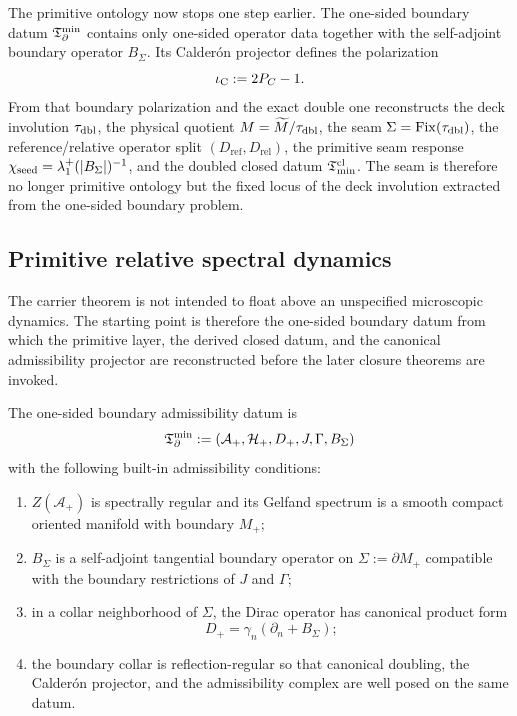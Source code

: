 \begin{remark}
The primitive ontology now stops one step earlier. The one-sided boundary datum $\mathfrak T_{\partial}^{\min}$
contains only one-sided operator data together with the self-adjoint boundary operator
$B_\Sigma$. Its Calder\'on projector defines the polarization
\[
\iota_{\mathrm C}:=2P_C-1.
\]
From that boundary polarization and the exact double one reconstructs the deck involution
$\tau_{\mathrm{dbl}}$, the physical quotient $M=\widetilde M/\tau_{\mathrm{dbl}}$, the seam
$\Sigma=\mathrm{Fix}(\tau_{\mathrm{dbl}})$, the reference/relative operator split
$(D_{\mathrm{ref}},D_{\mathrm{rel}})$, the primitive seam response
$\chi_{\mathrm{seed}}=\lambda_1^+(|B_\Sigma|)^{-1}$, and the doubled closed datum
$\mathfrak T_{\mathrm{min}}^{\mathrm{cl}}$. The seam is therefore no longer primitive ontology but the fixed locus of
the deck involution extracted from the one-sided boundary problem.
\end{remark}

\subsection{Primitive relative spectral dynamics}

The carrier theorem is not intended to float above an unspecified microscopic dynamics. The
starting point is therefore the one-sided boundary datum from which the primitive layer, the
derived closed datum, and the canonical admissibility projector are reconstructed before the later
closure theorems are invoked.

\begin{definition}
\label{def:reduced-theorem-datum}
The one-sided boundary admissibility datum is
\[
\mathfrak T_{\partial}^{\min}:=(\mathcal A_+,\mathcal H_+,D_+,J,\Gamma,B_\Sigma)
\]
with the following built-in admissibility conditions:
\begin{enumerate}[label=(\roman*), leftmargin=1.5em, topsep=3pt, itemsep=2pt]
    \item $Z(\mathcal A_+)$ is spectrally regular and its Gelfand spectrum is a smooth compact oriented manifold with boundary $M_+$;
    \item $B_\Sigma$ is a self-adjoint tangential boundary operator on $\Sigma:=\partial M_+$ compatible with the boundary restrictions of $J$ and $\Gamma$;
    \item in a collar neighborhood of $\Sigma$, the Dirac operator has canonical product form
    \[
    D_+=\gamma_n(\partial_n+B_\Sigma);
    \]
    \item the boundary collar is reflection-regular so that canonical doubling, the Calder\'on projector, and the admissibility complex are well posed on the same datum.
\end{enumerate}
\end{definition}

